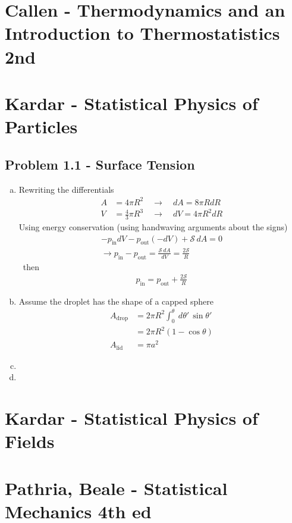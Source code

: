\documentclass[../main.tex]{subfiles}
\begin{document}
\section{{\sc Callen} - Thermodynamics and an Introduction to Thermostatistics 2nd}

\section{{\sc Kardar} - Statistical Physics of Particles}
\subsection{Problem 1.1 - Surface Tension}
\begin{enumerate}[(a)]
\item Rewriting the differentials
\begin{align}
A&=4\pi R^2\quad\rightarrow\quad dA=8\pi R dR\\
V&=\frac{4}{3}\pi R^3\quad\rightarrow\quad dV=4\pi R^2 dR
\end{align}
Using energy conservation (using handwaving arguments about the signs)
\begin{align}
-p_\text{in}dV-p_\text{out}(-dV)+\mathcal{S}\,dA=0\\
\rightarrow p_\text{in}-p_\text{out}=\frac{\mathcal{S}\,dA}{dV}=\frac{2\mathcal{S}}{R}
\end{align}\
then
\begin{align}
p_\text{in}=p_\text{out}+\frac{2\mathcal{S}}{R}
\end{align}
\item Assume the droplet has the shape of a capped sphere
\begin{align}
A_\text{drop}
&=2\pi R^2\int_0^\theta\ d\theta'\,\sin\theta'\\
&=2\pi R^2(1-\cos\theta)\\
A_\text{lid}
&=\pi a^2
\end{align}




\item
\item
\end{enumerate}

\section{{\sc Kardar} - Statistical Physics of Fields}

\section{{\sc Pathria, Beale} - Statistical Mechanics 4th ed}
\end{document}
